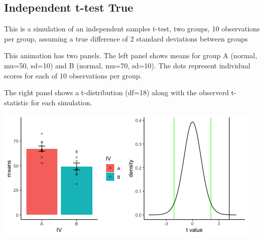 \documentclass[]{book}
\begin{document}
\hypertarget{independent-t-test-true}{%
\subsection{Independent t-test True}\label{independent-t-test-true}}

This is a simulation of an independent samples t-test, two groups, 10 observations per group, assuming a true difference of 2 standard deviations between groups

This animation has two panels. The left panel shows means for group A (normal, mu=50, sd=10) and B (normal, mu=70, sd=10). The dots represent individual scores for each of 10 observations per group.

The right panel shows a t-distribution (df=18) along with the observerd t-statistic for each simulation.

\includegraphics{gifs/indTtestTrue.gif}
\end{document}
